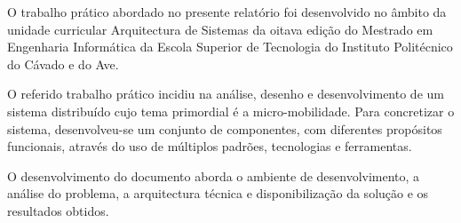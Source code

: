 O trabalho prático abordado no presente relatório foi desenvolvido no âmbito da unidade curricular Arquitectura de Sistemas da oitava edição do Mestrado em Engenharia Informática da Escola Superior de Tecnologia do Instituto Politécnico do Cávado e do Ave.

O referido trabalho prático incidiu na análise, desenho e desenvolvimento de um sistema distribuído cujo tema primordial é a micro-mobilidade. Para concretizar o sistema, desenvolveu-se um conjunto de componentes, com  diferentes propósitos funcionais, através do uso de múltiplos padrões, tecnologias e ferramentas.

O desenvolvimento do documento aborda o ambiente de desenvolvimento, a análise do problema, a arquitectura técnica e disponibilização da solução e os resultados obtidos.